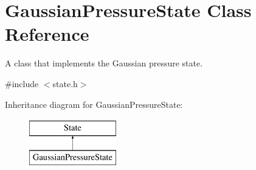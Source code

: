 \hypertarget{classGaussianPressureState}{\section{Gaussian\-Pressure\-State Class Reference}
\label{classGaussianPressureState}
}


A class that implements the Gaussian pressure state.  




{\ttfamily \#include $<$state.\-h$>$}

Inheritance diagram for Gaussian\-Pressure\-State\-:\begin{figure}[H]
\begin{center}
\leavevmode
\includegraphics[height=2.000000cm]{classGaussianPressureState}
\end{center}
\end{figure}
